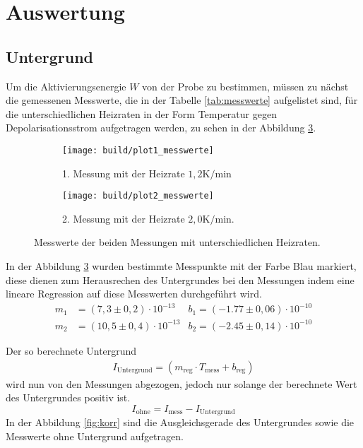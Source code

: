\section{Auswertung}
\label{sec:Auswertung}

\subsection{Untergrund}
\label{sec:Untergrund}

Um die Aktivierungsenergie $W$ von der Probe zu bestimmen,
müssen zu nächst die gemessenen
Messwerte, die in der Tabelle \ref{tab:messwerte} aufgelistet sind,
für die unterschiedlichen Heizraten in der Form
Temperatur gegen Depolarisationsstrom aufgetragen werden, zu sehen
in der Abbildung \ref{fig:mess}.



\begin{figure}
  \centering
  \begin{subfigure}{0.49\textwidth}
    \centering
    \texttt{[image: build/plot1\_messwerte]}
    \caption{1. Messung mit der Heizrate $1,2 \si{\kelvin\per\minute}$}
    \label{fig:mess1}
  \end{subfigure}
  \begin{subfigure}{0.49\textwidth}
    \centering
    \texttt{[image: build/plot2\_messwerte]}
    \caption{2. Messung mit der Heizrate $2,0 \si{\kelvin\per\minute}$.}
    \label{fig:mess2}
  \end{subfigure}
\caption{Messwerte der beiden Messungen mit unterschiedlichen Heizraten.}
\label{fig:mess}
\end{figure}


In der Abbildung \ref{fig:mess} wurden bestimmte
Messpunkte mit der Farbe Blau
markiert, diese dienen zum Herausrechen des Untergrundes
bei den Messungen indem eine lineare Regression auf diese Messwerten
durchgeführt wird.
\begin{align*}
m_1&= (7,3\pm0,2)\cdot10^{-13}      &b_1 =(-1.77\pm0,06)\cdot10^{-10} \\
m_2&=(10,5\pm0,4)\cdot10^{-13}      &b_2 =(-2.45\pm0,14)\cdot10^{-10}
\end{align*}

Der so berechnete Untergrund
\begin{align*}
  I_\mathrm{Untergrund}=(m_\mathrm{reg}\cdot T_\mathrm{mess}+b_\mathrm{reg})
\end{align*}
wird nun von den Messungen
abgezogen, jedoch nur solange der berechnete Wert
des Untergrundes positiv ist.
\begin{equation}
 I_{\mathrm{ohne}}=I_{\mathrm{mess}}-I_\mathrm{Untergrund}\label{eqn:Untergrund}
\end{equation}
In der Abbildung \ref{fig:korr} sind die Ausgleichsgerade des Untergrundes
sowie die Messwerte ohne Untergrund aufgetragen.

